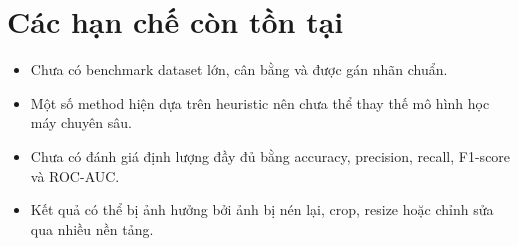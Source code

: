 \section{Các hạn chế còn tồn tại}
\begin{itemize}
  \item Chưa có benchmark dataset lớn, cân bằng và được gán nhãn chuẩn.
  \item Một số method hiện dựa trên heuristic nên chưa thể thay thế mô hình học máy chuyên sâu.
  \item Chưa có đánh giá định lượng đầy đủ bằng accuracy, precision, recall, F1-score và ROC-AUC.
  \item Kết quả có thể bị ảnh hưởng bởi ảnh bị nén lại, crop, resize hoặc chỉnh sửa qua nhiều nền tảng.
\end{itemize}
